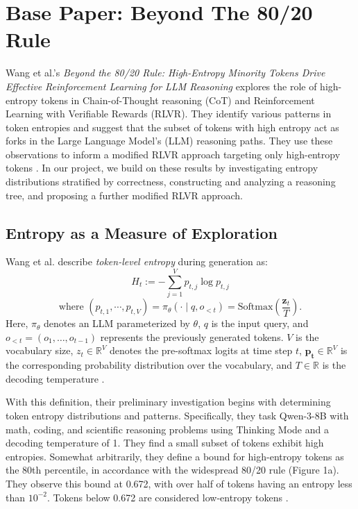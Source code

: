 \documentclass{article}
\begin{document}

\section{Base Paper: Beyond The 80/20 Rule}
Wang et al.’s \textit{Beyond the 80/20 Rule: High-Entropy Minority Tokens Drive Effective Reinforcement Learning for LLM Reasoning} explores the role of high-entropy tokens in Chain-of-Thought reasoning (CoT) and Reinforcement Learning with Verifiable Rewards (RLVR). They identify various patterns in token entropies and suggest that the subset of tokens with high entropy act as forks in the Large Language Model’s (LLM) reasoning paths. They use these observations to inform a modified RLVR approach targeting only high-entropy tokens \cite{wang_beyond_2025}. In our project, we build on these results by investigating entropy distributions stratified by correctness, constructing and analyzing a reasoning tree, and proposing a further modified RLVR approach.

\subsection{Entropy as a Measure of Exploration}
Wang et al. describe \textit{token-level entropy} during generation as:
$$H_t := -\sum_{j=1}^{V} p_{t,j} \log p_{t,j}$$
$$\text{where } (p_{t,1}, \cdots, p_{t,V}) = \pi_{\theta}(\cdot \mid q, o_{<t}) = \text{Softmax}\left(\frac{\mathbf{z}_t}{T}\right).$$
Here, $\pi_\theta$ denotes an LLM parameterized by $\theta$, $q$ is the input query, and $o_{<t} = (o_1, \dots , o_{t-1})$ represents the previously generated tokens. $V$ is the vocabulary size, $z_t \in \mathbb{R}^V$ denotes the pre-softmax logits at time step $t$, $\mathbf{p_t} \in \mathbb{R}^V$ is the corresponding probability distribution over the vocabulary, and $T \in \mathbb{R}$ is the decoding temperature \cite{wang_beyond_2025}.

With this definition, their preliminary investigation begins with determining token entropy distributions and patterns. Specifically, they task Qwen-3-8B \cite{yang_qwen3_2025} with math, coding, and scientific reasoning problems using Thinking Mode and a decoding temperature of 1. They find a small subset of tokens exhibit high entropies. Somewhat arbitrarily, they define a bound for high-entropy tokens as the 80th percentile, in accordance with the widespread 80/20 rule (Figure 1a). They observe this bound at 0.672, with over half of tokens having an entropy less than $10^{-2}$. Tokens below 0.672 are considered low-entropy tokens \cite{wang_beyond_2025}.
\end{document}

